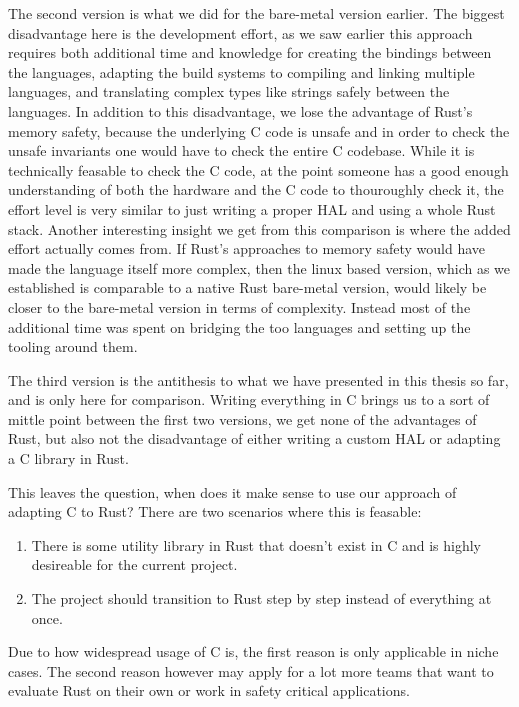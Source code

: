 The second version is what we did for the bare-metal version earlier.
The biggest disadvantage here is the development effort,
as we saw earlier this approach requires both additional time and knowledge for creating the bindings between the languages,
adapting the build systems to compiling and linking multiple languages, and translating complex types like strings safely between the languages.
In addition to this disadvantage, we lose the advantage of Rust's memory safety,
because the underlying C code is unsafe and in order to check the unsafe invariants one would have to check the entire C codebase.
While it is technically feasable to check the C code,
at the point someone has a good enough understanding of both the hardware and the C code to thouroughly check it,
the effort level is very similar to just writing a proper HAL and using a whole Rust stack.
Another interesting insight we get from this comparison is where the added effort actually comes from.
If Rust's approaches to memory safety would have made the language itself more complex,
then the linux based version,
which as we established is comparable to a native Rust bare-metal version,
would likely be closer to the bare-metal version in terms of complexity.
Instead most of the additional time was spent on bridging the too languages and setting up the tooling around them.

The third version is the antithesis to what we have presented in this thesis so far, and is only here for comparison.
Writing everything in C brings us to a sort of mittle point between the first two versions,
we get none of the advantages of Rust,
but also not the disadvantage of either writing a custom HAL or adapting a C library in Rust.

This leaves the question, when does it make sense to use our approach of adapting C to Rust?
There are two scenarios where this is feasable:
\begin{enumerate}
    \item There is some utility library in Rust that doesn't exist in C and is highly desireable for the current project.
    \item The project should transition to Rust step by step instead of everything at once.
\end{enumerate}

Due to how widespread usage of C is, the first reason is only applicable in niche cases.
The second reason however may apply for a lot more teams that want to evaluate Rust on their own or work in safety critical applications.